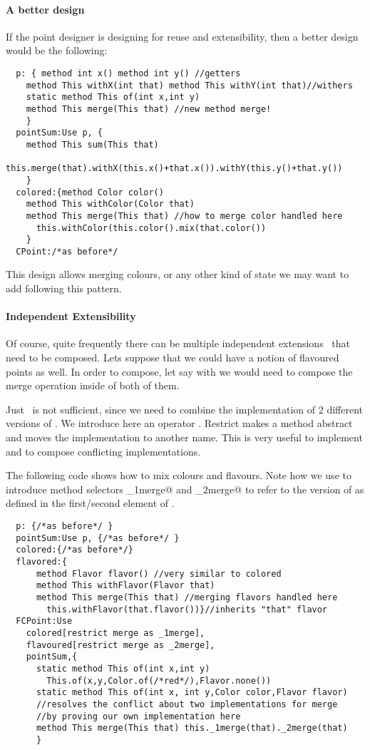 \paragraph{A better design}
If the point designer is designing for reuse and extensibility, then 
a better design would be the following:  
\saveSpace\begin{lstlisting}
  p: { method int x() method int y() //getters
    method This withX(int that) method This withY(int that)//withers
    static method This of(int x,int y)
    method This merge(This that) //new method merge!
    }
  pointSum:Use p, { 
    method This sum(This that)
      this.merge(that).withX(this.x()+that.x()).withY(this.y()+that.y())
    }
  colored:{method Color color()
    method This withColor(Color that)
    method This merge(This that) //how to merge color handled here
      this.withColor(this.color().mix(that.color())
    }
  CPoint:/*as before*/
\end{lstlisting}  \saveSpace
  \noindent This design allows merging colours, or any other kind of state we may want to add
  following this pattern.%

\paragraph{Independent Extensibility}
  Of course, quite frequently there can be multiple independent
  extensions~\cite{Zenger-Odersky2005} that need to be composed. Lets suppose that 
  we could have a notion of flavoured points as well.   
  In order to compose, let say \Q@colored@ with \Q@flavored@ we would
  need to compose the merge operation inside of both of them.

Just \use\ is not sufficient, since we need to combine the implementation of 2 different versions of \Q@merge@.
We introduce here an operator \Q@restrict@.
Restrict makes a method abstract and
moves the implementation to another name. This is very useful to implement \Q@super@
 and to compose conflicting implementations.

The following code shows how to mix colours and flavours. 
Note how we use \Q@restrict@ to introduce method selectors \Q@_1merge@ and \Q@_2merge@
to refer to the version of \Q@merge@ as defined in the first/second element of \use.
\saveSpace\begin{lstlisting}
  p: {/*as before*/ }
  pointSum:Use p, {/*as before*/ }
  colored:{/*as before*/}
  flavored:{
      method Flavor flavor() //very similar to colored
      method This withFlavor(Flavor that)
      method This merge(This that) //merging flavors handled here
        this.withFlavor(that.flavor())}//inherits "that" flavor
  FCPoint:Use
    colored[restrict merge as _1merge],
    flavoured[restrict merge as _2merge],
    pointSum,{
      static method This of(int x,int y)
        This.of(x,y,Color.of(/*red*/),Flavor.none())
      static method This of(int x, int y,Color color,Flavor flavor)
      //resolves the conflict about two implementations for merge
      //by proving our own implementation here
      method This merge(This that) this._1merge(that)._2merge(that)
      }
\end{lstlisting}  \saveSpace\saveSpace

